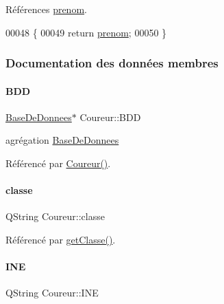 Références \hyperlink{class_coureur_a5e37d256b17765909423e183879c9e58}{prenom}.


\begin{DoxyCode}
00048 \{
00049     \textcolor{keywordflow}{return} \hyperlink{class_coureur_a5e37d256b17765909423e183879c9e58}{prenom};
00050 \}
\end{DoxyCode}


\subsubsection{Documentation des données membres}
\mbox{\label{class_coureur_a9890c210d97e593644b22cb0e8228527}} 
\paragraph{\texorpdfstring{B\+DD}{BDD}}
{\footnotesize\ttfamily \hyperlink{class_base_de_donnees}{Base\+De\+Donnees}$\ast$ Coureur\+::\+B\+DD\hspace{0.3cm}{\ttfamily [private]}}



agrégation \hyperlink{class_base_de_donnees}{Base\+De\+Donnees} 



Référencé par \hyperlink{class_coureur_af3a5607d96a0960b1666164f6a74d539}{Coureur()}.

\mbox{\label{class_coureur_a274255068bb91a5c66a365cd10528280}} 
\paragraph{\texorpdfstring{classe}{classe}}
{\footnotesize\ttfamily Q\+String Coureur\+::classe\hspace{0.3cm}{\ttfamily [private]}}



Référencé par \hyperlink{class_coureur_aa611e208767c4db4999e00296aa12632}{get\+Classe()}.

\mbox{\label{class_coureur_ac4028301fbd425848c2a81d69f8f94ac}} 
\paragraph{\texorpdfstring{I\+NE}{INE}}
{\footnotesize\ttfamily Q\+String Coureur\+::\+I\+NE\hspace{0.3cm}{\ttfamily [private]}}



